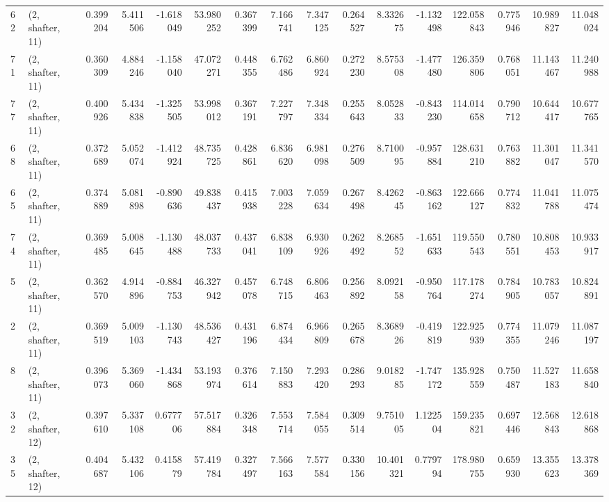 \begin{tabular}{llrrrrrrrrrrrrrr}
62  &  (2, shafter, 11) &   0.399204 &   5.411506 & -1.618049 &   53.980252 &  0.367399 &   7.166741 &   7.347125 &  0.264527 &   8.332675 &  -1.132498 &  122.058843 &  0.775946 &  10.989827 &  11.048024 \\
71  &  (2, shafter, 11) &   0.360309 &   4.884246 & -1.158040 &   47.072271 &  0.448355 &   6.762486 &   6.860924 &  0.272230 &   8.575308 &  -1.477480 &  126.359806 &  0.768051 &  11.143467 &  11.240988 \\
77  &  (2, shafter, 11) &   0.400926 &   5.434838 & -1.325505 &   53.998012 &  0.367191 &   7.227797 &   7.348334 &  0.255643 &   8.052833 &  -0.843230 &  114.014658 &  0.790712 &  10.644417 &  10.677765 \\
68  &  (2, shafter, 11) &   0.372689 &   5.052074 & -1.412924 &   48.735725 &  0.428861 &   6.836620 &   6.981098 &  0.276509 &   8.710095 &  -0.957884 &  128.631210 &  0.763882 &  11.301047 &  11.341570 \\
65  &  (2, shafter, 11) &   0.374889 &   5.081898 & -0.890636 &   49.838437 &  0.415938 &   7.003228 &   7.059634 &  0.267498 &   8.426245 &  -0.863162 &  122.666127 &  0.774832 &  11.041788 &  11.075474 \\
74  &  (2, shafter, 11) &   0.369485 &   5.008645 & -1.130488 &   48.037733 &  0.437041 &   6.838109 &   6.930926 &  0.262492 &   8.268552 &  -1.651633 &  119.550543 &  0.780551 &  10.808453 &  10.933917 \\
5   &  (2, shafter, 11) &   0.362570 &   4.914896 & -0.884753 &   46.327942 &  0.457078 &   6.748715 &   6.806463 &  0.256892 &   8.092158 &  -0.950764 &  117.178274 &  0.784905 &  10.783057 &  10.824891 \\
2   &  (2, shafter, 11) &   0.369519 &   5.009103 & -1.130743 &   48.536427 &  0.431196 &   6.874434 &   6.966809 &  0.265678 &   8.368926 &  -0.419819 &  122.925939 &  0.774355 &  11.079246 &  11.087197 \\
8   &  (2, shafter, 11) &   0.396073 &   5.369060 & -1.434868 &   53.193974 &  0.376614 &   7.150883 &   7.293420 &  0.286293 &   9.018285 &  -1.747172 &  135.928559 &  0.750487 &  11.527183 &  11.658840 \\
32  &  (2, shafter, 12) &   0.397610 &   5.337108 &  0.677706 &   57.517884 &  0.326348 &   7.553714 &   7.584055 &  0.309514 &   9.751005 &   1.122504 &  159.235821 &  0.697446 &  12.568843 &  12.618868 \\
35  &  (2, shafter, 12) &   0.404687 &   5.432106 &  0.415879 &   57.419784 &  0.327497 &   7.566163 &   7.577584 &  0.330156 &  10.401321 &   0.779794 &  178.980755 &  0.659930 &  13.355623 &  13.378369 \\

\end{tabular}
